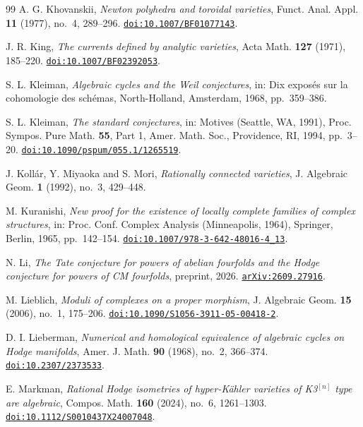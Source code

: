 \documentclass[11pt,reqno]{amsart}
\theoremstyle{plain}
\theoremstyle{definition}
\theoremstyle{remark}
\begin{document}
\begin{thebibliography}{99}
A. G. Khovanskii,
\emph{Newton polyhedra and toroidal varieties},
Funct. Anal. Appl. \textbf{11} (1977), no.~4, 289--296.
\href{https://doi.org/10.1007/BF01077143}{\texttt{doi:10.1007/BF01077143}}.

J. R. King,
\emph{The currents defined by analytic varieties},
Acta Math. \textbf{127} (1971), 185--220.
\href{https://doi.org/10.1007/BF02392053}{\texttt{doi:10.1007/BF02392053}}.

S. L. Kleiman,
\emph{Algebraic cycles and the Weil conjectures},
in: Dix expos\'es sur la cohomologie des sch\'emas,
North-Holland, Amsterdam, 1968, pp.~359--386.

S. L. Kleiman,
\emph{The standard conjectures},
in: Motives (Seattle, WA, 1991),
Proc. Sympos. Pure Math. \textbf{55}, Part 1,
Amer. Math. Soc., Providence, RI, 1994, pp.~3--20.
\href{https://doi.org/10.1090/pspum/055.1/1265519}{\texttt{doi:10.1090/pspum/055.1/1265519}}.

J. Koll\'ar, Y. Miyaoka and S. Mori,
\emph{Rationally connected varieties},
J. Algebraic Geom. \textbf{1} (1992), no.~3, 429--448.

M. Kuranishi,
\emph{New proof for the existence of locally complete families of complex
structures},
in: Proc. Conf. Complex Analysis (Minneapolis, 1964),
Springer, Berlin, 1965, pp.~142--154.
\href{https://doi.org/10.1007/978-3-642-48016-4_13}{\texttt{doi:10.1007/978-3-642-48016-4\_13}}.

N. Li,
\emph{The Tate conjecture for powers of abelian fourfolds and the Hodge
conjecture for powers of CM fourfolds},
preprint, 2026.
\href{https://arxiv.org/abs/2609.27916}{\texttt{arXiv:2609.27916}}.

M. Lieblich,
\emph{Moduli of complexes on a proper morphism},
J. Algebraic Geom. \textbf{15} (2006), no.~1, 175--206.
\href{https://doi.org/10.1090/S1056-3911-05-00418-2}%
{\texttt{doi:10.1090/S1056-3911-05-00418-2}}.

D. I. Lieberman,
\emph{Numerical and homological equivalence of algebraic cycles on Hodge
manifolds},
Amer. J. Math. \textbf{90} (1968), no.~2, 366--374.
\href{https://doi.org/10.2307/2373533}{\texttt{doi:10.2307/2373533}}.

E. Markman,
\emph{Rational Hodge isometries of hyper-K\"ahler varieties of K3$^{[n]}$
type are algebraic},
Compos. Math. \textbf{160} (2024), no.~6, 1261--1303.
\href{https://doi.org/10.1112/S0010437X24007048}{\texttt{doi:10.1112/S0010437X24007048}}.


\end{thebibliography}
\end{document}
